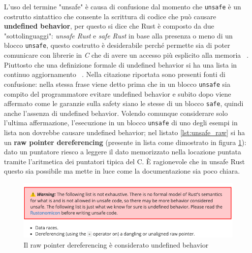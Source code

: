 \documentclass{report}
\begin{document}
L'uso del termine "unsafe" è causa di confusione dal momento che \colorbox{backcolour}{\texttt{unsafe}} è un costrutto sintattico che consente la scrittura di codice che può causare \textbf{undefined behavior}, per questo si dice che Rust è composto da due "sottolinguaggi": \textit{unsafe Rust} e \textit{safe Rust} in base alla presenza o meno di un blocco \colorbox{backcolour}{\texttt{unsafe}}, questo costrutto è desiderabile perché permette sia di poter comunicare con librerie in \textit{C} che di avere un accesso più esplicito alla memoria ~\cite[1.2]{rust:rustonomicon}. \\ 
Piuttosto che una definizione formale di undefined behavior si ha una lista in continuo aggiornamento ~\cite[14.3]{rust:reference}. 
Nella citazione riportata sono presenti fonti di confusione: nella stessa frase viene detto prima che in un blocco \colorbox{backcolour}{\texttt{unsafe}} sia compito del programmatore evitare undefined behavior e subito dopo viene affermato come le garanzie sulla safety siano le stesse di un blocco \colorbox{backcolour}{\texttt{safe}}, quindi anche l'assenza di undefined behavior. Volendo comunque considerare solo l'ultima affermazione, l'esecuzione in un blocco \colorbox{backcolour}{\texttt{unsafe}} di uno degli esempi in lista non dovrebbe causare undefined behavior; nel listato \ref{lst:unsafe_raw} si ha un \textbf{raw pointer dereferencing} (presente in lista come dimostrato in figura \ref{fig:warning}): dato un puntatore riesco a leggere il dato memorizzato nella locazione puntata tramite l'aritmetica dei puntatori tipica del C. È ragionevole che in unsafe Rust questo sia possibile ma mette in luce come la documentazione sia poco chiara. 




\begin{figure}[h!t]
    \centering
    \label{fig:warning}
    \includegraphics[scale=0.45]{images/warning_undefined_behavior.png}
    \caption{Il raw pointer dereferencing è considerato undefined behavior}
\end{figure}
\end{document}
